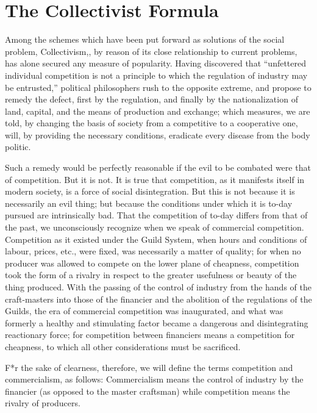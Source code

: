 \documentclass{book}
\begin{document}
\chapter{The Collectivist Formula}
\label{chapter-1}
Among the schemes which have been put forward as solutions of the social problem, Collectivism,\footnotemark[1], by reason of its close relationship to current problems, has alone secured any measure of popularity. Having discovered that “unfettered individual competition is not a principle to which the regulation of industry may be entrusted,” political philosophers rush to the opposite extreme, and propose to remedy the defect, first by the regulation, and finally by the nationalization of land, capital, and the means of production and exchange; which measures, we are told, by changing the basis of society from a competitive to a cooperative one, will, by providing the necessary conditions, eradicate every disease from the body politic.

Such a remedy would be perfectly reasonable if the evil to be combated were that of competition. But it is not. It is true that competition, as it manifests itself in modern society, is a force of social disintegration. But this is not because it is necessarily an evil thing; but because the conditions under which it is to-day pursued are intrinsically bad. That the competition of to-day differs from that of the past, we unconsciously recognize when we speak of commercial competition. Competition as it existed under the Guild System, when hours and conditions of labour, prices, etc., were fixed, was necessarily a matter of quality; for when no producer was allowed to compete on the lower plane of cheapness, competition took the form of a rivalry in respect to the greater usefulness or beauty of the thing produced. With the passing of the control of industry from the hands of the craft-masters into those of the financier and the abolition of the regulations of the Guilds, the era of commercial competition was inaugurated, and what was formerly a healthy and stimulating factor became a dangerous and disintegrating reactionary force; for competition between financiers means a competition for cheapness, to which all other considerations must be sacrificed.

F*r the sake of clearness, therefore, we will define the terms competition and commercialism, as follows: Commercialism means the control of industry by the financier (as opposed to the master craftsman) while competition means the rivalry of producers.
\end{document}
